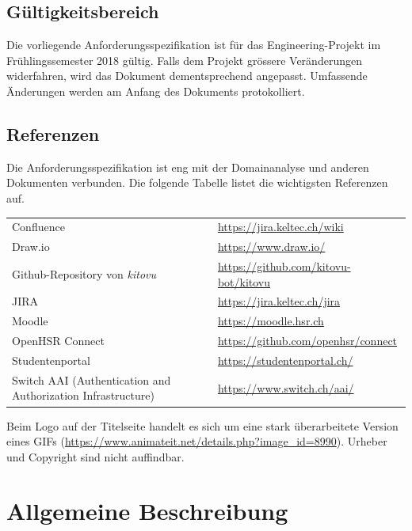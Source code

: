 \documentclass[a4paper]{article}
\let\oldsection\section
\renewcommand\section{\clearpage\oldsection}
\def\jiraurl{https://jira.keltec.ch/jira}
\def\confluenceurl{https://jira.keltec.ch/wiki}
\begin{document}
\subsection{Gültigkeitsbereich}
Die vorliegende Anforderungsspezifikation ist für das Engineering-Projekt im Frühlingssemester 2018 gültig. Falls dem Projekt grössere Veränderungen widerfahren, wird das Dokument dementsprechend angepasst. Umfassende Änderungen werden am Anfang des Dokuments protokolliert.

\subsection{Referenzen}


Die Anforderungsspezifikation ist eng mit der Domainanalyse und anderen Dokumenten verbunden. Die folgende Tabelle listet die wichtigsten Referenzen auf.

\begin{tabulary}{\linewidth}{ll}
	Confluence & \url{\confluenceurl} \\
	Draw.io & \url{https://www.draw.io/} \\
	Github-Repository von \emph{kitovu} & \url{https://github.com/kitovu-bot/kitovu} \\
	JIRA	& \url{\jiraurl} \\
	Moodle & \url{https://moodle.hsr.ch} \\
	OpenHSR Connect & \url{https://github.com/openhsr/connect} \\
	Studentenportal & \url{https://studentenportal.ch/} \\
	Switch AAI (Authentication and Authorization Infrastructure)& \url{https://www.switch.ch/aai/} \\
	
\end{tabulary}

Beim Logo auf der Titelseite handelt es sich um eine stark überarbeitete Version eines GIFs (\url{https://www.animateit.net/details.php?image_id=8990}). Urheber und Copyright sind nicht auffindbar.

\pagebreak
\section{Allgemeine Beschreibung}
\end{document}
